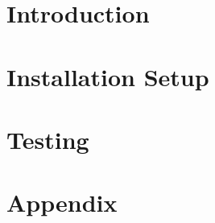 \setcounter{page}{2}


\newpage
\tableofcontents
\newpage
{}
{}
\listoffigures
{}
{}
\listoftables

\clearpage
\section{Introduction}
\label{sect:introduction}


\clearpage
\section{Installation Setup}
\label{sect:installsetup}


\clearpage
\section{Testing}
\label{sect:testing}


\clearpage
\section{Appendix}
\label{sect:appendix}



%
%


